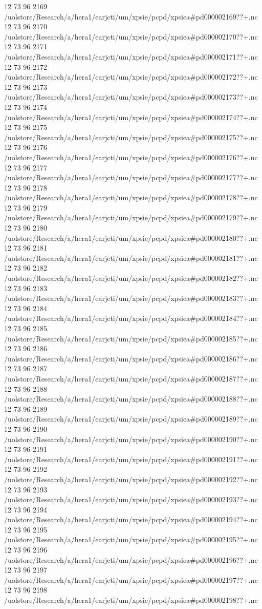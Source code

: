 12 73 96
2169
/uolstore/Research/a/hera1/earjcti/um/xpsie/pcpd/xpsiea#pd000002169??+.nc
12 73 96
2170
/uolstore/Research/a/hera1/earjcti/um/xpsie/pcpd/xpsiea#pd000002170??+.nc
12 73 96
2171
/uolstore/Research/a/hera1/earjcti/um/xpsie/pcpd/xpsiea#pd000002171??+.nc
12 73 96
2172
/uolstore/Research/a/hera1/earjcti/um/xpsie/pcpd/xpsiea#pd000002172??+.nc
12 73 96
2173
/uolstore/Research/a/hera1/earjcti/um/xpsie/pcpd/xpsiea#pd000002173??+.nc
12 73 96
2174
/uolstore/Research/a/hera1/earjcti/um/xpsie/pcpd/xpsiea#pd000002174??+.nc
12 73 96
2175
/uolstore/Research/a/hera1/earjcti/um/xpsie/pcpd/xpsiea#pd000002175??+.nc
12 73 96
2176
/uolstore/Research/a/hera1/earjcti/um/xpsie/pcpd/xpsiea#pd000002176??+.nc
12 73 96
2177
/uolstore/Research/a/hera1/earjcti/um/xpsie/pcpd/xpsiea#pd000002177??+.nc
12 73 96
2178
/uolstore/Research/a/hera1/earjcti/um/xpsie/pcpd/xpsiea#pd000002178??+.nc
12 73 96
2179
/uolstore/Research/a/hera1/earjcti/um/xpsie/pcpd/xpsiea#pd000002179??+.nc
12 73 96
2180
/uolstore/Research/a/hera1/earjcti/um/xpsie/pcpd/xpsiea#pd000002180??+.nc
12 73 96
2181
/uolstore/Research/a/hera1/earjcti/um/xpsie/pcpd/xpsiea#pd000002181??+.nc
12 73 96
2182
/uolstore/Research/a/hera1/earjcti/um/xpsie/pcpd/xpsiea#pd000002182??+.nc
12 73 96
2183
/uolstore/Research/a/hera1/earjcti/um/xpsie/pcpd/xpsiea#pd000002183??+.nc
12 73 96
2184
/uolstore/Research/a/hera1/earjcti/um/xpsie/pcpd/xpsiea#pd000002184??+.nc
12 73 96
2185
/uolstore/Research/a/hera1/earjcti/um/xpsie/pcpd/xpsiea#pd000002185??+.nc
12 73 96
2186
/uolstore/Research/a/hera1/earjcti/um/xpsie/pcpd/xpsiea#pd000002186??+.nc
12 73 96
2187
/uolstore/Research/a/hera1/earjcti/um/xpsie/pcpd/xpsiea#pd000002187??+.nc
12 73 96
2188
/uolstore/Research/a/hera1/earjcti/um/xpsie/pcpd/xpsiea#pd000002188??+.nc
12 73 96
2189
/uolstore/Research/a/hera1/earjcti/um/xpsie/pcpd/xpsiea#pd000002189??+.nc
12 73 96
2190
/uolstore/Research/a/hera1/earjcti/um/xpsie/pcpd/xpsiea#pd000002190??+.nc
12 73 96
2191
/uolstore/Research/a/hera1/earjcti/um/xpsie/pcpd/xpsiea#pd000002191??+.nc
12 73 96
2192
/uolstore/Research/a/hera1/earjcti/um/xpsie/pcpd/xpsiea#pd000002192??+.nc
12 73 96
2193
/uolstore/Research/a/hera1/earjcti/um/xpsie/pcpd/xpsiea#pd000002193??+.nc
12 73 96
2194
/uolstore/Research/a/hera1/earjcti/um/xpsie/pcpd/xpsiea#pd000002194??+.nc
12 73 96
2195
/uolstore/Research/a/hera1/earjcti/um/xpsie/pcpd/xpsiea#pd000002195??+.nc
12 73 96
2196
/uolstore/Research/a/hera1/earjcti/um/xpsie/pcpd/xpsiea#pd000002196??+.nc
12 73 96
2197
/uolstore/Research/a/hera1/earjcti/um/xpsie/pcpd/xpsiea#pd000002197??+.nc
12 73 96
2198
/uolstore/Research/a/hera1/earjcti/um/xpsie/pcpd/xpsiea#pd000002198??+.nc
